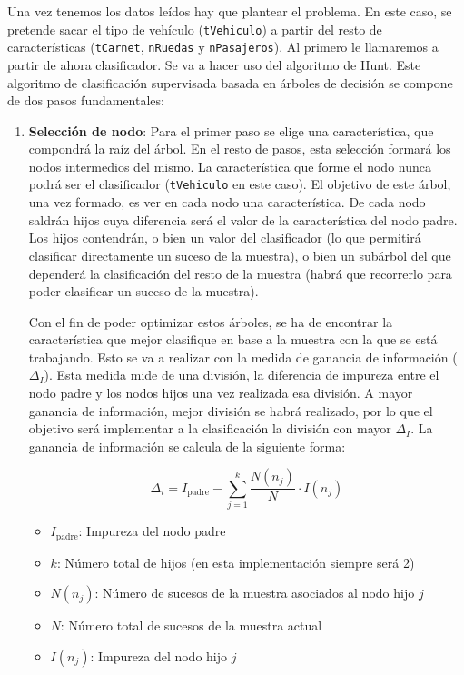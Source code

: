 \documentclass[12pt]{report}\usepackage[]{graphicx}\usepackage[dvipsnames]{xcolor}
\begin{document}
 				Una vez tenemos los datos leídos hay que plantear el problema. En este caso, se pretende sacar el tipo de vehículo (\texttt{tVehiculo}) a partir del resto de características (\texttt{tCarnet}, \texttt{nRuedas} y \texttt{nPasajeros}). Al primero le llamaremos a partir de ahora clasificador. Se va a hacer uso del algoritmo de Hunt. Este algoritmo de clasificación supervisada basada en árboles de decisión se compone de dos pasos fundamentales:
 				
 				\begin{enumerate}[label = \textbf{\arabic*.}]
 					\item \textbf{Selección de nodo}: Para el primer paso se elige una característica, que compondrá la raíz del árbol. En el resto de pasos, esta selección formará los nodos intermedios del mismo. La característica que forme el nodo nunca podrá ser el clasificador (\texttt{tVehiculo} en este caso). El objetivo de este árbol, una vez formado, es ver en cada nodo una característica. De cada nodo saldrán hijos cuya diferencia será el valor de la característica del nodo padre. Los hijos contendrán, o bien un valor del clasificador (lo que permitirá clasificar directamente un suceso de la muestra), o bien un subárbol del que dependerá la clasificación del resto de la muestra (habrá que recorrerlo para poder clasificar un suceso de la muestra). 
 					
 					Con el fin de poder optimizar estos árboles, se ha de encontrar la característica que mejor clasifique en base a la muestra con la que se está trabajando. Esto se va a realizar con la medida de ganancia de información ($\Delta_I$). Esta medida mide de una división, la diferencia de impureza entre el nodo padre y los nodos hijos una vez realizada esa división. A mayor ganancia de información, mejor división se habrá realizado, por lo que el objetivo será implementar a la clasificación la división con mayor $\Delta_I$. La ganancia de información se calcula de la siguiente forma:
 					
 					
					$$
					\Delta_i = I_{\text{padre}} - \sum_{j=1}^k \frac{N(n_j)}{N} \cdot I(n_j)
					$$
 					
 					\begin{itemize}
 						\item $I_{\text{padre}}$: Impureza del nodo padre
 						\item $k$: Número total de hijos (en esta implementación siempre será 2)
 						\item $N(n_j)$: Número de sucesos de la muestra asociados al nodo hijo $j$
 						\item $N$: Número total de sucesos de la muestra actual
 						\item $I(n_j)$: Impureza del nodo hijo $j$
 					\end{itemize}
 					

\end{enumerate}
\end{document}
